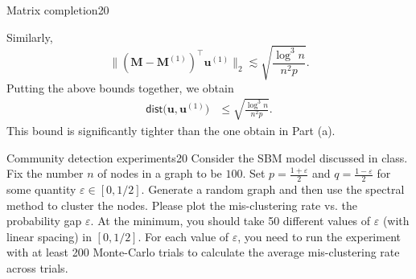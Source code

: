 \documentclass{article}
\begin{document}
\begin{problem}{Matrix completion}{20}
{Similarly, 
\[
\|( {\bm{M}}- {\bm{M}}^{(1)})^{\top} {\bm{u}}^{(1)}\|_{2}\lesssim\sqrt{\frac{\log^{3}n}{n^{2}p}}.
\]
Putting the above bounds together, we obtain
\begin{align}
\mathsf{dist}\big( {\bm{u}}, {\bm{u}}^{(1)}\big) & \leq\sqrt{\frac{\log^{3}n}{n^{2}p}}.
\end{align}
This bound is significantly tighter than the one obtain in Part (a). 
 


}

\end{problem}


\begin{problem}{Community detection experiments}{20}
Consider the SBM model discussed in class. Fix the number $n$ of nodes in a graph to be $100$. Set $p=\frac{1+ \varepsilon}{2}$ and $q=\frac{1-\varepsilon}{2}$ for some quantity $\varepsilon \in [0,1/2]$. Generate a random graph and then use the spectral method to cluster the nodes. Please plot the mis-clustering rate vs. the probability gap $\varepsilon$. At the minimum, you should take 50 different values of $\varepsilon$ (with linear spacing) in $[0, 1/2]$. For each value of $\varepsilon$, you need to run the experiment with at least 200 Monte-Carlo trials to calculate the average mis-clustering rate across trials. 
\end{problem}
\end{document}
